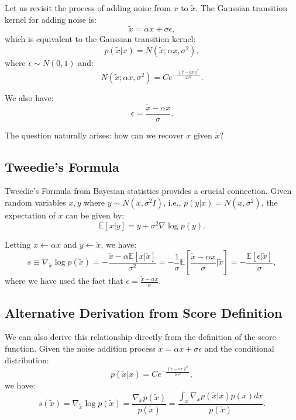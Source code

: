 Let us revisit the process of adding noise from $x$ to $\tilde{x}$. The Gaussian transition kernel for adding noise is:
\begin{equation}
\tilde{x} = \alpha x + \sigma \epsilon,
\end{equation}
which is equivalent to the Gaussian transition kernel:
\begin{equation}
p(\tilde{x}|x) = N(\tilde{x}; \alpha x, \sigma^2),
\end{equation}
where $\epsilon \sim N(0,1)$ and:
\begin{equation}
N(\tilde{x};\alpha x, \sigma^2) = C e^{-\frac{\|\tilde{x}-\alpha x\|^2}{2\sigma^2}}.
\end{equation}

We also have:
\begin{equation}
\epsilon = \frac{\tilde{x}-\alpha x}{\sigma}.
\end{equation}

The question naturally arises: how can we recover $x$ given $\tilde{x}$?

\subsection{Tweedie's Formula}

Tweedie's Formula from Bayesian statistics provides a crucial connection. Given random variables $x, y$ where $y \sim N(x, \sigma^2 I)$, i.e., $p(y|x) = N(x, \sigma^2)$, the expectation of $x$ can be given by:
\begin{equation}
\mathbb{E}[x|y] = y + \sigma^2 \nabla \log p(y).
\end{equation}

Letting $x \leftarrow \alpha x$ and $y \leftarrow \tilde{x}$, we have:
\begin{equation}
s \equiv \nabla_{\tilde{x}} \log p(\tilde{x}) = -\frac{\tilde{x}-\alpha \mathbb{E}[x|\tilde{x}]}{\sigma^2} = -\frac{1}{\sigma}\mathbb{E}\left[\frac{\tilde{x}-\alpha x}{\sigma}|\tilde{x}\right] = -\frac{\mathbb{E}[\epsilon|\tilde{x}]}{\sigma},
\end{equation}
where we have used the fact that $\epsilon = \frac{\tilde{x}-\alpha x}{\sigma}$.

\subsection{Alternative Derivation from Score Definition}

We can also derive this relationship directly from the definition of the score function. Given the noise addition process $\tilde{x} = \alpha x + \sigma \epsilon$ and the conditional distribution:
\begin{equation}
p(\tilde{x}|x) = Ce^{-\frac{\|\tilde{x}-\alpha x\|^2}{2\sigma^2}},
\end{equation}
we have:
\begin{equation}
s(\tilde{x}) = \nabla_{\tilde{x}}\log p(\tilde{x}) = \frac{\nabla_{\tilde{x}}p(\tilde{x})}{p(\tilde{x})} = \frac{\int_x \nabla_{\tilde{x}}p(\tilde{x}|x) p(x)dx}{p(\tilde{x})}.
\end{equation}

